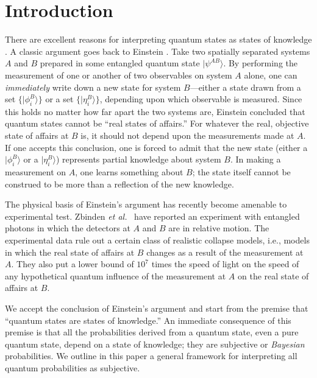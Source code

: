 \medskip

\section{Introduction}

There are excellent reasons for interpreting quantum states as states
of knowledge \cite{FuchsPeres00}. A classic argument goes back to
Einstein \cite{Einstein}. Take two spatially separated systems $A$
and $B$ prepared in some entangled quantum state
$|\psi^{\scriptscriptstyle AB}\rangle$.  By performing the
measurement of one or another of two observables on system $A$
alone, one can {\it immediately\/} write down a new state for system
$B$---either a state drawn from a set $\{|\phi_i^{\scriptscriptstyle
B}\rangle\}$ or a set $\{|\eta_i^{\scriptscriptstyle B}\rangle\}$,
depending upon which observable is measured.  Since this holds no
matter how far apart the two systems are, Einstein concluded that
quantum states cannot be ``real states of affairs.''  For whatever
the real, objective state of affairs at $B$ is, it should not depend
upon the measurements made at $A$.  If one accepts this conclusion,
one is forced to admit that the new state (either a
$|\phi_i^{\scriptscriptstyle B}\rangle$ or a
$|\eta_i^{\scriptscriptstyle B}\rangle$) represents partial knowledge
about system $B$.  In making a measurement on $A$, one learns
something about $B$; the state itself cannot be construed to be more
than a reflection of the new knowledge.

The physical basis of
Einstein's argument has recently become amenable to experimental
test. Zbinden {\it et al.}~\cite{Zbinden2001} have reported an
experiment with entangled photons in which the detectors at $A$ and
$B$ are in relative motion. The experimental data rule out a certain
class of realistic collapse models, i.e., models in which the real
state of affairs at $B$ changes as a result of the measurement at
$A$. They also put a lower bound of $10^7$ times the speed of light
on the speed of any hypothetical quantum influence of the measurement
at $A$ on the real state of affairs at $B$.

We accept the conclusion of Einstein's argument and start from the
premise that ``quantum states are states of knowledge.''  An
immediate consequence of this premise is that all the probabilities
derived from a quantum state, even a pure quantum state, depend on a
state of knowledge; they are subjective or {\it Bayesian\/}
probabilities.  We outline in this paper a general framework for
interpreting all quantum probabilities as subjective.

